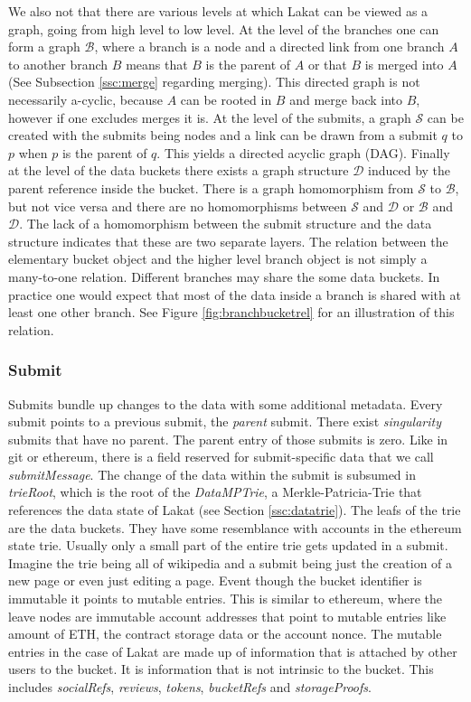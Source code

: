 \documentclass[14pt]{article}
\begin{document}
We also not that there are various levels at which Lakat can be viewed as a graph, going from high level to low level. At the level of the branches one can form a graph $\mathcal B$, where a branch is a node and a directed link from one branch $A$ to another branch $B$ means that $B$ is the parent of $A$ or that $B$ is merged into $A$ (See Subsection \ref{ssc:merge} regarding merging). This directed graph is not necessarily a-cyclic, because $A$ can be rooted in $B$ and merge back into $B$, however if one excludes merges it is. At the level of the submits, a graph $\mathcal S$ can be created with the submits being nodes and a link can be drawn from a submit $q$ to $p$ when $p$ is the parent of $q$. This yields a directed acyclic graph (DAG). Finally at the level of the data buckets there exists a graph structure $\mathcal D$ induced by the parent reference inside the bucket. There is a graph homomorphism from $\mathcal S$ to $\mathcal B$, but not vice versa and there are no homomorphisms between $\mathcal S$ and $\mathcal D$ or $\mathcal B$ and $\mathcal D$. The lack of a homomorphism between the submit structure and the data structure indicates that these are two separate layers. The relation between the elementary bucket object and the higher level branch object is not simply a many-to-one relation. Different branches may share the some data buckets. In practice one would expect that most of the data inside a branch is shared with at least one other branch. See Figure \ref{fig:branchbucketrel} for an illustration of this relation.



\subsubsection{Submit}
\label{ssc:submit}
Submits bundle up changes to the data with some additional metadata. Every submit points to a previous submit, the \textit{parent} submit. There exist \textit{singularity} submits that have no parent. The parent entry of those submits is zero. Like in git or ethereum, there is a field reserved for submit-specific data that we call \textit{submitMessage}. The change of the data within the submit is subsumed in \textit{trieRoot}, which is the root of the \textit{DataMPTrie}, a Merkle-Patricia-Trie that references the data state of Lakat (see Section \ref{ssc:datatrie}). The leafs of the trie are the data buckets. They have some resemblance with accounts in the ethereum state trie. Usually only a small part of the entire trie gets updated in a submit. Imagine the trie being all of wikipedia and a submit being just the creation of a new page or even just editing a page. Event though the bucket identifier is immutable it points to mutable entries. This is similar to ethereum, where the leave nodes are immutable account addresses that point to mutable entries like amount of ETH, the contract storage data or the account nonce. The mutable entries in the case of Lakat are made up of information that is attached by other users to the bucket. It is information that is not intrinsic to the bucket. This includes \textit{socialRefs}, \textit{reviews}, \textit{tokens}, \textit{bucketRefs} and \textit{storageProofs}. 
\end{document}

